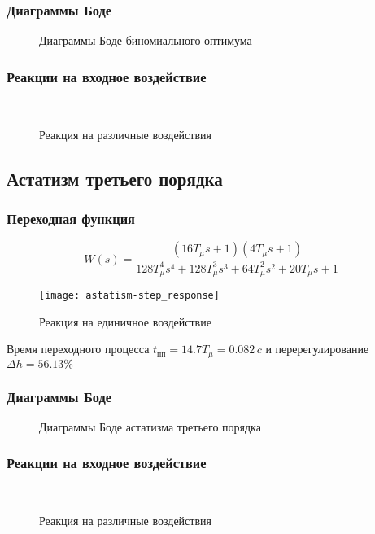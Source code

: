 			\subsubsection{Диаграммы Боде}
				\begin{figure}[H]
					\centering
					\caption{Диаграммы Боде биномиального оптимума}
				\end{figure}
			\subsubsection{Реакции на входное воздействие}
				\begin{figure}[H]
					\centering
					\\
					\centering{}
					\caption{Реакция на различные воздействия}
				\end{figure}
		\newpage
		\subsection{Астатизм третьего порядка}
			\subsubsection{Переходная функция}
				$$W(s)=\frac{(16T_\mu s+1)(4T_\mu s+1)}{128T_\mu^4 s^4+128T_\mu^3s^3+64T_\mu^2 s^2+20T_\mu s+1}$$
				\begin{figure}[H]
					\centering
					\texttt{[image: astatism-step\_response]}
					\caption{Реакция на единичное воздействие}
				\end{figure}
				Время переходного процесса $t_{\text{пп}}=14.7T_{\mu}=0.082\,c$ и перерегулирование $\Delta h=56.13\%$
			\subsubsection{Диаграммы Боде}
				\begin{figure}[H]
					\centering
					\caption{Диаграммы Боде астатизма третьего порядка}
				\end{figure}
			\subsubsection{Реакции на входное воздействие}
				\begin{figure}[H]
					\centering
					\\
					\centering{}
					\caption{Реакция на различные воздействия}
				\end{figure}
